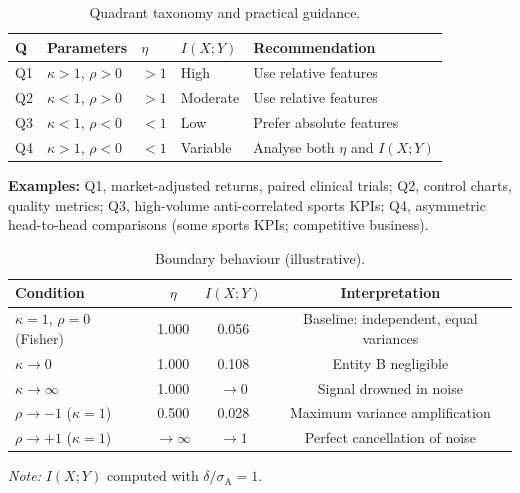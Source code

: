\begin{table}[p]
  \centering
  \caption{Quadrant taxonomy and practical guidance.}
  \label{tab:quadrants}
  \begin{tabular}{@{}lllll@{}}
    \toprule
    \textbf{Q} & \textbf{Parameters} & $\eta$ & $I(X;Y)$ & \textbf{Recommendation} \\
    \midrule
    Q1 & $\kappa>1$, $\rho>0$  & $>1$  & High     & Use relative features \\
    Q2 & $\kappa<1$, $\rho>0$  & $>1$  & Moderate & Use relative features \\
    Q3 & $\kappa<1$, $\rho<0$  & $<1$  & Low      & Prefer absolute features \\
    Q4 & $\kappa>1$, $\rho<0$  & $<1$  & Variable & Analyse both $\eta$ and $I(X;Y)$ \\
    \bottomrule
  \end{tabular}

  \medskip
  \begin{minipage}{0.95\linewidth}\small
    \textbf{Examples:} Q1, market-adjusted returns, paired clinical trials; Q2, control charts, quality metrics; Q3, high-volume anti-correlated sports KPIs; Q4, asymmetric head-to-head comparisons (some sports KPIs; competitive business).
  \end{minipage}
\end{table}

\begin{table}[p]
  \centering
  \caption{Boundary behaviour (illustrative).}
  \label{tab:boundary}
  \begin{tabular}{@{}lccc@{}}
    \toprule
    \textbf{Condition} & $\eta$ & $I(X;Y)$ & \textbf{Interpretation} \\
    \midrule
    $\kappa=1$, $\rho=0$ (Fisher) & 1.000 & 0.056 & Baseline: independent, equal variances \\
    $\kappa\to 0$                 & 1.000 & 0.108 & Entity B negligible \\
    $\kappa\to\infty$             & 1.000 & $\to 0$ & Signal drowned in noise \\
    $\rho\to -1$ ($\kappa=1$)     & 0.500 & 0.028 & Maximum variance amplification \\
    $\rho\to +1$ ($\kappa=1$)     & $\to\infty$ & $\to 1$ & Perfect cancellation of noise \\
    \bottomrule
  \end{tabular}

  \medskip
  \begin{minipage}{0.95\linewidth}\small
    \textit{Note:} $I(X;Y)$ computed with $\delta/\sigma_{\mathrm{A}}=1$.
  \end{minipage}
\end{table}

